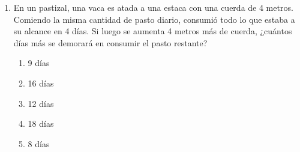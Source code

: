 \begin{enumerate}
	\begin{enumerate}[label=\alph*)]
		\item 140
		\item 124
		\item 144
		\item 112
		\item 104
	\end{enumerate}
	
	\textbf{Respuesta correcta:} a)
	
	\vspace{2mm}
	\textbf{Solucionario:}\\
	La proporción: $\dfrac{a}{b} = \dfrac{c}{d} \quad \text{(I)}$
	
	Se le quita la misma cantidad:
	$\left. \begin{array}{l} 
		a - x = 20 \Rightarrow a = 20 + x \\
		b - x = 28 \Rightarrow b = 28 + x \\
		c - x = 32 \Rightarrow c = 32 + x \\
		d - x = 44 \Rightarrow d = 44 + x 
	\end{array} \right\} \text{(II)}$
	
	Se tendrá que:\\
	$a + b + c + d = 124 + 4x \quad \text{(III)}$
	
	Remplazando (II) en (I) y resolviendo:
	$$\frac{20 + x}{28 + x} = \frac{32 + x}{44 + x} \Rightarrow 880 + 64x + x^2 = 896 + 60x + x^2$$
	$4x = 16 \Rightarrow x = 4$
	
	Se pide $a + b + c + d = ?$\\
	De (III): $a + b + c + d = 124 + 4(4) = 140$
	
	\vspace{6mm}


\item En un pastizal, una vaca es atada a una estaca con una cuerda de 4 metros. Comiendo la misma cantidad de pasto diario, consumió todo lo que estaba a su alcance en 4 días. Si luego se aumenta 4 metros más de cuerda, ¿cuántos días más se demorará en consumir el pasto restante?

\begin{enumerate}[label=\alph*)]
	\item 9 días
	\item 16 días
	\item 12 días
	\item 18 días
	\item 8 días
\end{enumerate}


\end{enumerate}
